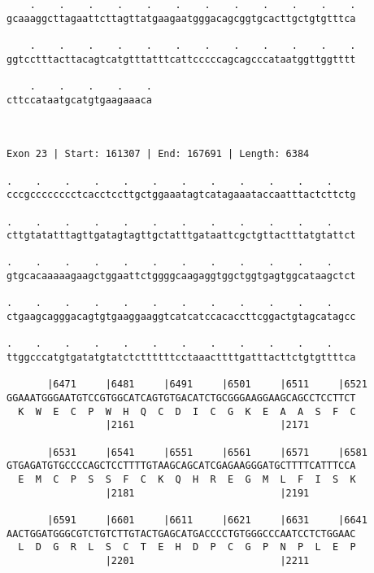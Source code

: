 \documentclass{article}
\begin{document}
\begin{Verbatim}
    .    .    .    .    .    .    .    .    .    .    .    .
gcaaaggcttagaattcttagttatgaagaatgggacagcggtgcacttgctgtgtttca
                                                            
    .    .    .    .    .    .    .    .    .    .    .    .
ggtcctttacttacagtcatgtttatttcattcccccagcagcccataatggttggtttt
                                                            
    .    .    .    .    .
cttccataatgcatgtgaagaaaca
                         
                         
 
Exon 23 | Start: 161307 | End: 167691 | Length: 6384
 
.    .    .    .    .    .    .    .    .    .    .    .    
cccgcccccccctcacctccttgctggaaatagtcatagaaataccaatttactcttctg
                                                            
.    .    .    .    .    .    .    .    .    .    .    .    
cttgtatatttagttgatagtagttgctatttgataattcgctgttactttatgtattct
                                                            
.    .    .    .    .    .    .    .    .    .    .    .    
gtgcacaaaaagaagctggaattctggggcaagaggtggctggtgagtggcataagctct
                                                            
.    .    .    .    .    .    .    .    .    .    .    .    
ctgaagcagggacagtgtgaaggaaggtcatcatccacaccttcggactgtagcatagcc
                                                            
.    .    .    .    .    .    .    .    .    .    .    .    
ttggcccatgtgatatgtatctcttttttcctaaacttttgatttacttctgtgttttca
                                                            
       |6471     |6481     |6491     |6501     |6511     |6521
GGAAATGGGAATGTCCGTGGCATCAGTGTGACATCTGCGGGAAGGAAGCAGCCTCCTTCT
  K  W  E  C  P  W  H  Q  C  D  I  C  G  K  E  A  A  S  F  C
                 |2161                         |2171        
  
       |6531     |6541     |6551     |6561     |6571     |6581
GTGAGATGTGCCCCAGCTCCTTTTGTAAGCAGCATCGAGAAGGGATGCTTTTCATTTCCA
  E  M  C  P  S  S  F  C  K  Q  H  R  E  G  M  L  F  I  S  K
                 |2181                         |2191        
  
       |6591     |6601     |6611     |6621     |6631     |6641
AACTGGATGGGCGTCTGTCTTGTACTGAGCATGACCCCTGTGGGCCCAATCCTCTGGAAC
  L  D  G  R  L  S  C  T  E  H  D  P  C  G  P  N  P  L  E  P
                 |2201                         |2211        
  

\end{Verbatim}
\end{document}
